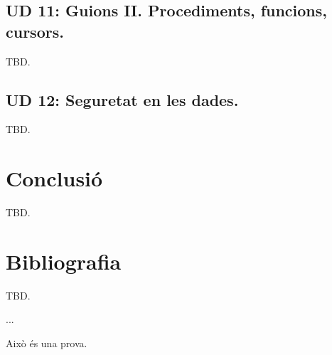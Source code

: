 \documentclass[catalan, a4paper, 12pt, titlepage]{article}
\begin{document}
  \subsection{UD 11: Guions II. Procediments, funcions, cursors.}
  TBD.

  \subsection{UD 12: Seguretat en les dades.}
  TBD.

\section{Conclusió}
TBD.

\section{Bibliografia}
TBD.

...

Això és una prova.
\end{document}
